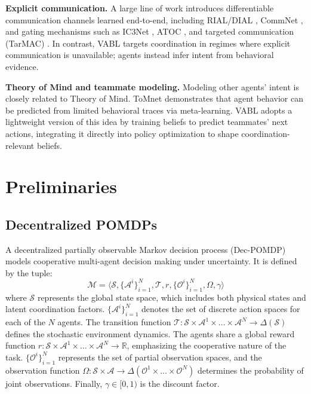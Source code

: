 \documentclass{article}
\theoremstyle{plain}
\theoremstyle{definition}
\theoremstyle{remark}
\begin{document}
\textbf{Explicit communication.}
A large line of work introduces differentiable communication channels learned end-to-end, including RIAL/DIAL \cite{foerster2016dial}, CommNet \cite{sukhbaatar2016commnet}, and gating mechanisms such as IC3Net \cite{singh2018ic3net}, ATOC \cite{jiang2018atoc}, and targeted communication (TarMAC) \cite{das2019tarmac}. In contrast, VABL targets coordination in regimes where explicit communication is unavailable; agents instead infer intent from behavioral evidence.

\textbf{Theory of Mind and teammate modeling.}
Modeling other agents' intent is closely related to Theory of Mind. ToMnet \cite{rabinowitz2018tomnet} demonstrates that agent behavior can be predicted from limited behavioral traces via meta-learning. VABL adopts a lightweight version of this idea by training beliefs to predict teammates' next actions, integrating it directly into policy optimization to shape coordination-relevant beliefs.

\section{Preliminaries}
\label{sec:prelim}

\subsection{Decentralized POMDPs}
A decentralized partially observable Markov decision process (Dec-POMDP) models cooperative multi-agent decision making under uncertainty. It is defined by the tuple:
\begin{equation}
\mathcal{M} = \langle \mathcal{S}, \{\mathcal{A}^i\}_{i=1}^N, \mathcal{T}, r, \{\mathcal{O}^i\}_{i=1}^N, \Omega, \gamma \rangle
\end{equation}
where $\mathcal{S}$ represents the global state space, which includes both physical states and latent coordination factors. $\{\mathcal{A}^i\}_{i=1}^N$ denotes the set of discrete action spaces for each of the $N$ agents. The transition function $\mathcal{T}: \mathcal{S} \times \mathcal{A}^1 \times \dots \times \mathcal{A}^N \rightarrow \Delta(\mathcal{S})$ defines the stochastic environment dynamics. The agents share a global reward function $r: \mathcal{S} \times \mathcal{A}^1 \times \dots \times \mathcal{A}^N \rightarrow \mathbb{R}$, emphasizing the cooperative nature of the task. $\{\mathcal{O}^i\}_{i=1}^N$ represents the set of partial observation spaces, and the observation function $\Omega: \mathcal{S} \times \mathcal{A} \rightarrow \Delta(\mathcal{O}^1 \times \dots \times \mathcal{O}^N)$ determines the probability of joint observations. Finally, $\gamma \in [0,1)$ is the discount factor.
\end{document}
